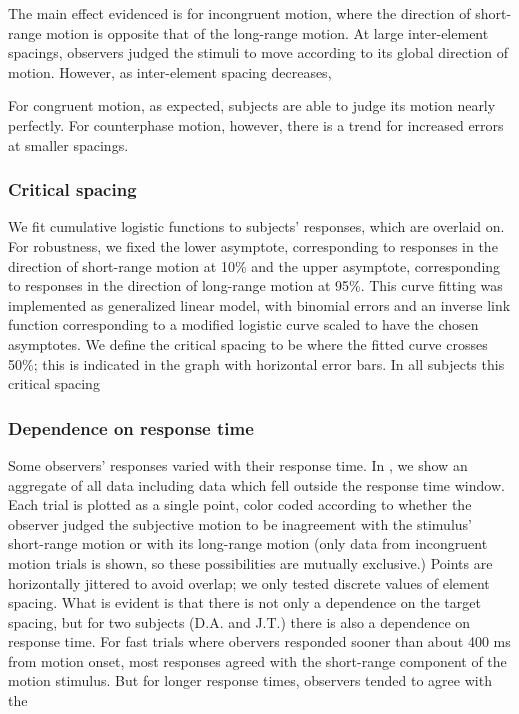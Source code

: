 \documentclass[english,jou]{article}
\begin{document}
The main effect evidenced is for incongruent motion, where the direction
of short-range motion is opposite that of the long-range motion. At
large inter-element spacings, observers judged the stimuli to move
according to its global direction of motion. However, as inter-element
spacing decreases,

For congruent motion, as expected, subjects are able to judge its
motion nearly perfectly. For counterphase motion, however, there is
a trend for increased errors at smaller spacings.  


\subsubsection{Critical spacing}

We fit cumulative logistic functions to subjects' responses, which
are overlaid on. For robustness, we fixed the
lower asymptote, corresponding to responses in the direction of short-range
motion at 10\% and the upper asymptote, corresponding to responses
in the direction of long-range motion at 95\%.  This curve fitting
was implemented as generalized linear model, with binomial errors
and an inverse link function corresponding to a modified logistic
curve scaled to have the chosen asymptotes. We define the critical
spacing to be where the fitted curve crosses 50\%; this is indicated
in the graph with horizontal error bars. In all subjects this critical
spacing 


\subsubsection{Dependence on response time}

Some observers' responses varied with their response time. In ,
we show an aggregate of all data including data which fell outside
the response time window. Each trial is plotted as a single point,
color coded according to whether the observer judged the subjective
motion to be inagreement with the stimulus' short-range motion or
with its long-range motion (only data from incongruent motion trials
is shown, so these possibilities are mutually exclusive.) Points are
horizontally jittered to avoid overlap; we only tested discrete values
of element spacing. What is evident is that there is not only a dependence
on the target spacing, but for two subjects (D.A. and J.T.) there
is also a dependence on response time. For fast trials where obervers
responded sooner than about 400 ms from motion onset, most responses
agreed with the short-range component of the motion stimulus. But
for longer response times, observers tended to agree with the 
\end{document}
